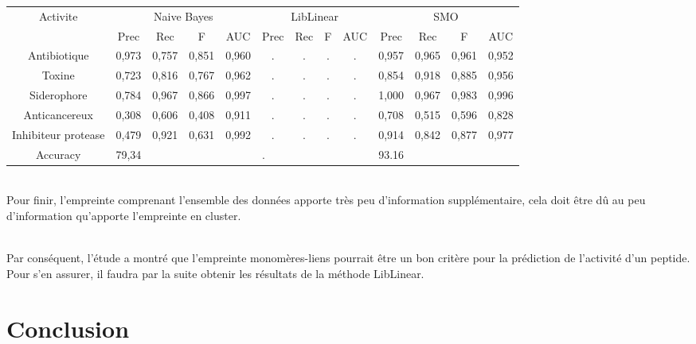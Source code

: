 \documentclass[a4paper,10pt]{report}
\begin{document}
	   \begin{flushleft}
	    \leftskip -3cm
	    \begin{tabular}{|c||c|c|c|c||c|c|c|c||c|c|c|c|}\hline
	      {Activite} & \multicolumn{4}{c||}{Naive Bayes} & \multicolumn{4}{c||}{LibLinear} & \multicolumn{4}{c|}{SMO} \\\cline{2-13}
	      & Prec & Rec & F & AUC & Prec & Rec & F & AUC & Prec & Rec & F & AUC \\\hline
	      Antibiotique &  0,973 & 0,757 & 0,851 & 0,960 & . & . & . & . & 0,957 & 0,965 & 0,961 & 0,952 \\\hline
	      Toxine & 0,723 & 0,816 & 0,767 & 0,962 & . & . & . & . & 0,854 & 0,918 & 0,885 & 0,956  \\\hline
	      Siderophore & 0,784 & 0,967 & 0,866 & 0,997 & . & . & . & . & 1,000 & 0,967 & 0,983 & 0,996  \\\hline
	      Anticancereux & 0,308 & 0,606 & 0,408 & 0,911 & . & . & . & . & 0,708 & 0,515 & 0,596 & 0,828 \\\hline
	      Inhibiteur protease & 0,479 & 0,921 & 0,631 & 0,992 & . & . & . & . & 0,914  & 0,842 & 0,877 & 0,977 \\\hline
	      Accuracy & \multicolumn{4}{l||}{79,34} & \multicolumn{4}{l||}{.} & \multicolumn{4}{l|}{93.16} \\\hline
	    \end{tabular}
	     \label{table 6}
	  \end{flushleft}
	  
	  \\ Pour finir, l'empreinte comprenant l'ensemble des données apporte très peu d'information supplémentaire, cela doit être dû au peu d'information qu'apporte l'empreinte en cluster.

	  
	  
	  \\ Par conséquent, l'étude a montré que l'empreinte monomères-liens pourrait être un bon critère pour la prédiction de l'activité d'un peptide.
	     Pour s'en assurer, il faudra par la suite obtenir les résultats de la méthode LibLinear.
	     
      
     
  \section*{Conclusion}
     
    \newpage
\end{document}
